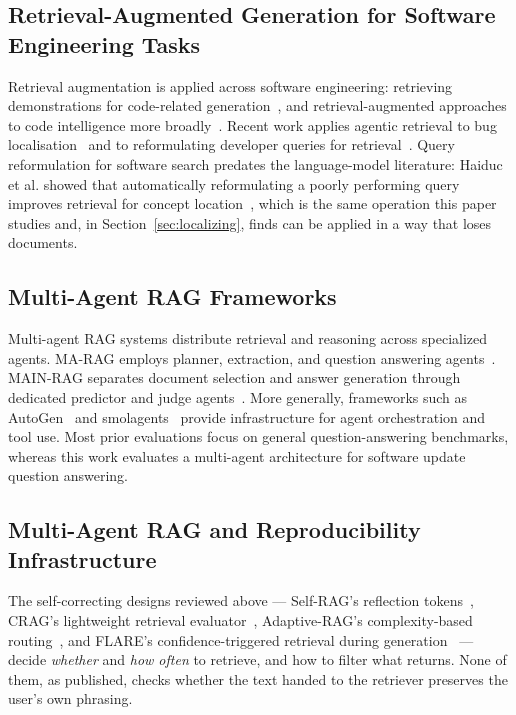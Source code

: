 \documentclass[acmsmall,review,anonymous,screen]{acmart}
\begin{document}
\subsection{Retrieval-Augmented Generation for Software Engineering Tasks}

Retrieval augmentation is applied across software engineering: retrieving
demonstrations for code-related generation~\cite{nashid2023retrieval}, and
retrieval-augmented approaches to code intelligence more
broadly~\cite{yang2025ragcode}. Recent work applies agentic retrieval to bug
localisation~\cite{mamun2026blagent} and to reformulating developer queries for
retrieval~\cite{caumartin2026reformulate}. Query reformulation for software search
predates the language-model literature: Haiduc et al. showed that automatically
reformulating a poorly performing query improves retrieval for concept
location~\cite{haiduc2013reformulation}, which is the same operation this paper
studies and, in Section~\ref{sec:localizing}, finds can be applied in a way that
loses documents.

\subsection{Multi-Agent RAG Frameworks}

Multi-agent RAG systems distribute retrieval and reasoning across
specialized agents. MA-RAG employs planner, extraction, and question
answering agents~\cite{nguyen2025marag}. MAIN-RAG separates document
selection and answer generation through dedicated predictor and judge
agents~\cite{wang2024mainrag}. More generally, frameworks such as
AutoGen~\cite{wu2023autogen} and smolagents~\cite{huggingface2024agents}
provide infrastructure for agent orchestration and tool use. Most prior
evaluations focus on general question-answering benchmarks, whereas this
work evaluates a multi-agent architecture for software update question
answering.

\subsection{Multi-Agent RAG and Reproducibility Infrastructure}

The self-correcting designs reviewed above --- Self-RAG's reflection
tokens~\cite{asai2024selfrag}, CRAG's lightweight retrieval
evaluator~\cite{yan2024crag}, Adaptive-RAG's complexity-based
routing~\cite{jeong2024adaptiverag}, and FLARE's confidence-triggered retrieval
during generation~\cite{jiang2023flare} --- decide \emph{whether} and \emph{how
often} to retrieve, and how to filter what returns. None of them, as published,
checks whether the text handed to the retriever preserves the user's own
phrasing.
\end{document}
